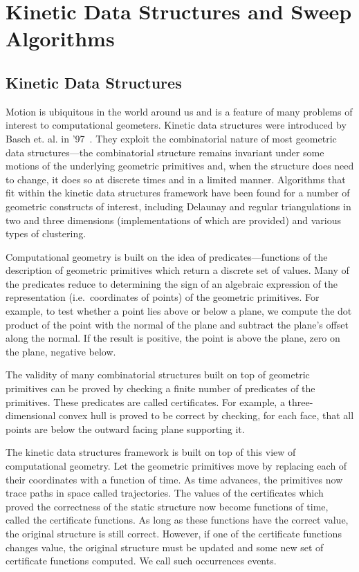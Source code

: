 \section{Kinetic Data Structures and Sweep Algorithms}
\label{sec:kds_intro}


\subsection{Kinetic Data Structures}
Motion is ubiquitous in the world around us and is a feature of many
problems of interest to computational geometers. Kinetic data
structures were introduced by Basch et. al. in
'97~\cite{cgal:bgh-dsmd-97}. They exploit the combinatorial nature of most
geometric data structures---the combinatorial structure remains
invariant under some motions of the underlying geometric primitives
and, when the structure does need to change, it does so at discrete
times and in a limited manner. Algorithms that fit within the kinetic
data structures framework have been found for a number of geometric
constructs of interest, including Delaunay and regular triangulations
in two and three dimensions (implementations of which are provided)
and various types of clustering.

Computational geometry is built on the idea of
predicates---functions of the description of geometric
primitives which return a discrete set of values. Many of the
predicates reduce to determining the sign of an algebraic expression
of the representation (i.e.\ coordinates of points) of the geometric
primitives. For example, to test whether a point lies above or below a
plane, we compute the dot product of the point with the normal of the
plane and subtract the plane's offset along the normal. If the result
is positive, the point is above the plane, zero on the plane, negative
below.

The validity of many combinatorial structures built on top of
geometric primitives can be proved by checking a finite number of
predicates of the primitives. These predicates are called 
  certificates. For example, a three-dimensional convex hull is
proved to be correct by checking, for each face, that all points are
below the outward facing plane supporting it.

The kinetic data structures framework is built on top of this view of
computational geometry. Let the geometric primitives move by replacing
each of their coordinates with a function of time. As time advances,
the primitives now trace paths in space called trajectories. The
values of the certificates which proved the correctness of the static
structure now become functions of time, called the certificate
  functions. As long as these functions have the correct value, the
original structure is still correct. However, if one of the
certificate functions changes value, the original structure must be
updated and some new set of certificate functions computed. We call
such occurrences events.

